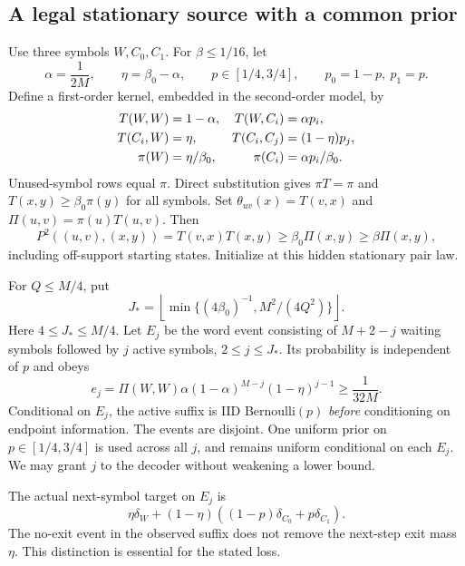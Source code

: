 \documentclass[11pt,letterpaper]{article}
\theoremstyle{definition}\newtheorem{definition}[theorem]{Definition}
\theoremstyle{remark}\newtheorem{remark}[theorem]{Remark}
\newcommand{\floor}[1]{\left\lfloor #1\right\rfloor}
\newcommand{\betaz}{\beta_0}
\begin{document}
\subsection{A legal stationary source with a common prior}
Use three symbols $W,C_0,C_1$. For $\beta\le1/16$, let
\[
 \alpha=\frac1{2M},\qquad \eta=\betaz-\alpha,\qquad
 p\in[1/4,3/4],\qquad p_0=1-p,\ p_1=p.
\]
Define a first-order kernel, embedded in the second-order model, by
\begin{align}\label{eq:witness}
 T(W,W)&=1-\alpha,& T(W,C_i)&=\alpha p_i,\notag\\
 T(C_i,W)&=\eta,& T(C_i,C_j)&=(1-\eta)p_j,\\
 \pi(W)&=\eta/\betaz,& \pi(C_i)&=\alpha p_i/\betaz.\notag
\end{align}
Unused-symbol rows equal $\pi$. Direct substitution gives $\pi T=\pi$ and $T(x,y)\ge\betaz\pi(y)$ for all symbols. Set $\theta_{uv}(x)=T(v,x)$ and $\Pi(u,v)=\pi(u)T(u,v)$. Then
\[
 P^2((u,v),(x,y))=T(v,x)T(x,y)\ge\betaz\Pi(x,y)\ge\beta\Pi(x,y),
\]
including off-support starting states. Initialize at this hidden stationary pair law.

For $Q\le M/4$, put
\begin{equation}\label{eq:jcut}
 J_* =\floor{\min\{(4\betaz)^{-1},M^2/(4Q^2)\}}.
\end{equation}
Here $4\le J_*\le M/4$. Let $E_j$ be the word event consisting of $M+2-j$ waiting symbols followed by $j$ active symbols, $2\le j\le J_*$. Its probability is independent of $p$ and obeys
\begin{equation}\label{eq:eventmass}
 e_j=\Pi(W,W)\alpha(1-\alpha)^{M-j}(1-\eta)^{j-1}\ge\frac1{32M}.
\end{equation}
Conditional on $E_j$, the active suffix is IID Bernoulli$(p)$ \emph{before} conditioning on endpoint information. The events are disjoint. One uniform prior on $p\in[1/4,3/4]$ is used across all $j$, and remains uniform conditional on each $E_j$. We may grant $j$ to the decoder without weakening a lower bound.

The actual next-symbol target on $E_j$ is
\begin{equation}\label{eq:target}
 \eta\delta_W+(1-\eta)((1-p)\delta_{C_0}+p\delta_{C_1}).
\end{equation}
The no-exit event in the observed suffix does not remove the next-step exit mass $\eta$. This distinction is essential for the stated loss.
\end{document}

